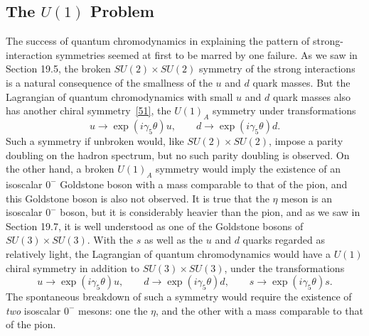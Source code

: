 \subsection{\texorpdfstring{The $U(1)$ Problem}{The U(1) Problem}}
\label{sec:19.10}

The success of quantum chromodynamics in explaining the pattern of strong-interaction symmetries seemed at first to be marred by one failure. As we saw in Section 19.5, the broken $SU(2)\times SU(2)$ symmetry of the strong interactions is a natural consequence of the smallness of the $u$ and $d$ quark masses. But the Lagrangian of quantum chromodynamics with small $u$ and $d$ quark masses also has another chiral symmetry~\hyperref[ch19-ref-51]{[51]}, the $U(1)_A$ symmetry under transformations
\begin{equation}
u\longrightarrow\exp(i\gamma_5\theta)u,
\qquad
d\longrightarrow\exp(i\gamma_5\theta)d.
\tag{19.10.1}\label{eq:19.10.1}
\end{equation}
Such a symmetry if unbroken would, like $SU(2)\times SU(2)$, impose a parity doubling on the hadron spectrum, but no such parity doubling is observed. On the other hand, a broken $U(1)_A$ symmetry would imply the existence of an isoscalar $0^-$ Goldstone boson with a mass comparable to that of the pion, and this Goldstone boson is also not observed. It is true that the $\eta$ meson is an isoscalar $0^-$ boson, but it is considerably heavier than the pion, and as we saw in Section 19.7, it is well understood as one of the Goldstone bosons of $SU(3)\times SU(3)$. With the $s$ as well as the $u$ and $d$ quarks regarded as relatively light, the Lagrangian of quantum chromodynamics would have a $U(1)$ chiral symmetry in addition to $SU(3)\times SU(3)$, under the transformations
\begin{equation}
u\longrightarrow\exp(i\gamma_5\theta)u,
\qquad
d\longrightarrow\exp(i\gamma_5\theta)d,
\qquad
s\longrightarrow\exp(i\gamma_5\theta)s.
\tag{19.10.2}\label{eq:19.10.2}
\end{equation}
The spontaneous breakdown of such a symmetry would require the existence of \emph{two} isoscalar $0^-$ mesons: one the $\eta$, and the other with a mass comparable to that of the pion.

